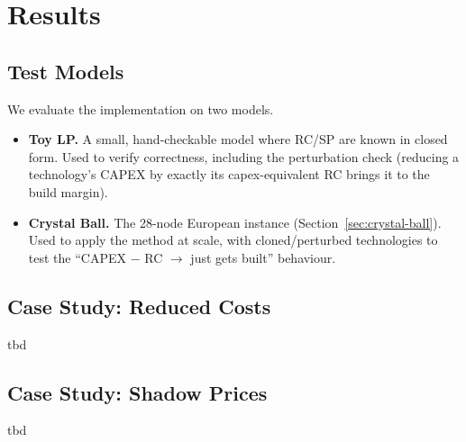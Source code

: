 \section{Results}
\label{sec:results}

\subsection{Test Models}
\label{sec:test-models}
We evaluate the implementation on two models.
\begin{itemize}
	\item \textbf{Toy LP.} A small, hand-checkable model where \ac{RC}/\ac{SP}
	are known in closed form. Used to verify correctness, including the
	perturbation check (reducing a technology's \ac{CAPEX} by exactly its
	capex-equivalent \ac{RC} brings it to the build margin).
	\item \textbf{Crystal Ball.} The 28-node European instance
	(Section~\ref{sec:crystal-ball}). Used to apply the method at scale, with
	cloned/perturbed technologies to test the ``\ac{CAPEX} $-$ \ac{RC} $\to$ just
	gets built'' behaviour.
\end{itemize}

\subsection{Case Study: Reduced Costs}
\label{sec:case-rc}
tbd

\subsection{Case Study: Shadow Prices}
\label{sec:case-sp}
tbd
